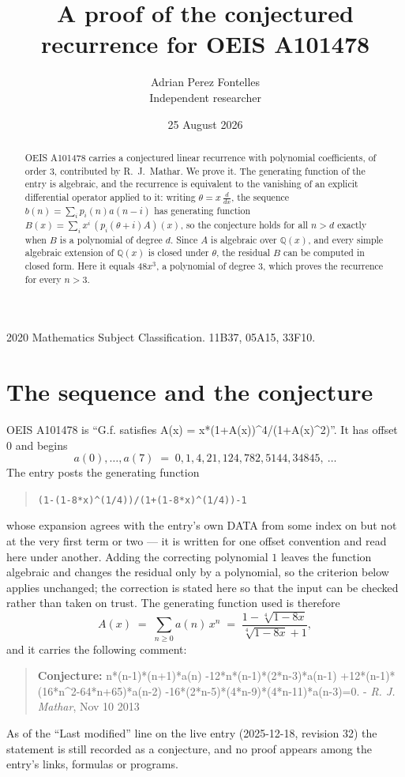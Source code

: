 \documentclass[11pt,a4paper]{article}
\title{A proof of the conjectured recurrence for OEIS A101478}
\author{Adrian Perez Fontelles\\ \small Independent researcher}
\date{25 August 2026}
\theoremstyle{plain}
\theoremstyle{definition}
\begin{document}
\maketitle

\begin{abstract}
OEIS A101478 carries a conjectured linear recurrence with polynomial coefficients, of
order 3, contributed by R.~J.~Mathar. We prove it. The generating function of the
entry is algebraic, and the recurrence is equivalent to the vanishing of an explicit
differential operator applied to it: writing $\theta=x\,\frac{d}{dx}$, the sequence
$b(n)=\sum_{i}p_{i}(n)a(n-i)$ has generating function
$B(x)=\sum_{i}x^{i}\,(p_{i}(\theta+i)A)(x)$, so the conjecture holds for all $n>d$ exactly
when $B$ is a polynomial of degree $d$. Since $A$ is algebraic over $\mathbb{Q}(x)$, and every simple
algebraic extension of $\mathbb{Q}(x)$ is closed under $\theta$, the residual $B$ can be
computed in closed form. Here it equals $48 x^{3}$, a polynomial of degree $3$, which proves
the recurrence for every $n>3$.
\end{abstract}

\noindent\small 2020 Mathematics Subject Classification. 11B37, 05A15, 33F10.\normalsize

\section{The sequence and the conjecture}

OEIS A101478 is ``G.f. satisfies A(x) = x*(1+A(x))\textasciicircum{}4/(1+A(x)\textasciicircum{}2)''. It has offset $0$ and begins
\[
a(0),\dots,a(7)\;=\;0, 1, 4, 21, 124, 782, 5144, 34845,\ \dots
\]
The entry posts the generating function
\begin{quote}\small
\texttt{(1-(1-8*x)\textasciicircum{}(1/4))/(1+(1-8*x)\textasciicircum{}(1/4))-1}
\end{quote}
whose expansion agrees with the entry's own DATA from some index on but not at the very
first term or two --- it is written for one offset convention and read here under another.
Adding the correcting polynomial $1$ leaves the function algebraic and changes
the residual only by a polynomial, so the criterion below applies unchanged; the correction
is stated here so that the input can be checked rather than taken on trust. The generating
function used is therefore
\begin{equation}\label{eq:gf}
A(x)\;=\;\sum_{n\ge 0} a(n)\,x^{n}\;=\;\frac{1 - \sqrt[4]{1 - 8 x}}{\sqrt[4]{1 - 8 x} + 1} ,
\end{equation}
and it carries the following comment:
\begin{quote}\small
\textbf{Conjecture:} n*(n-1)*(n+1)*a(n) -12*n*(n-1)*(2*n-3)*a(n-1) +12*(n-1)*(16*n\textasciicircum{}2-64*n+65)*a(n-2) -16*(2*n-5)*(4*n-9)*(4*n-11)*a(n-3)=0. - \emph{R. J. Mathar}, Nov 10 2013
\end{quote}
As of the ``Last modified'' line on the live entry (2025-12-18, revision 32) the
statement is still recorded as a conjecture, and no proof appears among the entry's links,
formulas or programs.
\end{document}
